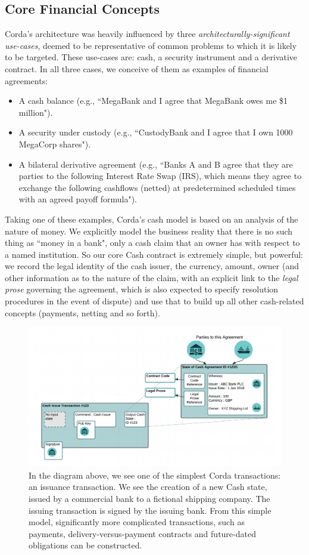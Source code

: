 \documentclass{article}
\begin{document}
\subsection{Core Financial Concepts}
Corda's architecture was heavily influenced by three \textit{architecturally-significant use-cases}, deemed to be  representative of common problems to which it is likely to be targeted.  These use-cases are: cash, a security instrument and a derivative contract. In all three cases, we conceive of them as examples of financial agreements:
\begin{itemize}
\item A cash balance (e.g., ``MegaBank and I agree that MegaBank owes me \$1 million").
\item A security under custody (e.g., ``CustodyBank and I agree that I own 1000 MegaCorp shares").
\item A bilateral derivative agreement (e.g., ``Banks A and B agree that they are parties to the following Interest Rate Swap (IRS), which means they agree to exchange the following cashflows (netted) at predetermined scheduled times with an agreed payoff formula").
\end{itemize}
Taking one of these examples, Corda's cash model is based on an analysis of the nature of money. We explicitly model the business reality that there is no such thing as ``money in a bank", only a cash claim that an owner has with respect to a named institution.\cite{BOE} So our core Cash contract is extremely simple, but powerful: we record the legal identity of the cash issuer, the currency, amount, owner (and other information as to the nature of the claim, with an explicit link to the \textit{legal prose} governing the agreement, which is also expected to specify resolution procedures in the event of dispute) and use that to build up all other cash-related concepts (payments, netting and so forth).
\begin{figure}[H]
\includegraphics[scale = .4, center]{cash}
\caption{In the diagram above, we see one of the simplest Corda transactions: an issuance transaction.  We see the creation of a new Cash state, issued by a commercial bank to a fictional shipping company. The issuing transaction is signed by the issuing bank.  From this simple model, significantly more complicated transactions, such as payments, delivery-versus-payment contracts and future-dated obligations can be constructed.}
\end{figure}
\end{document}
